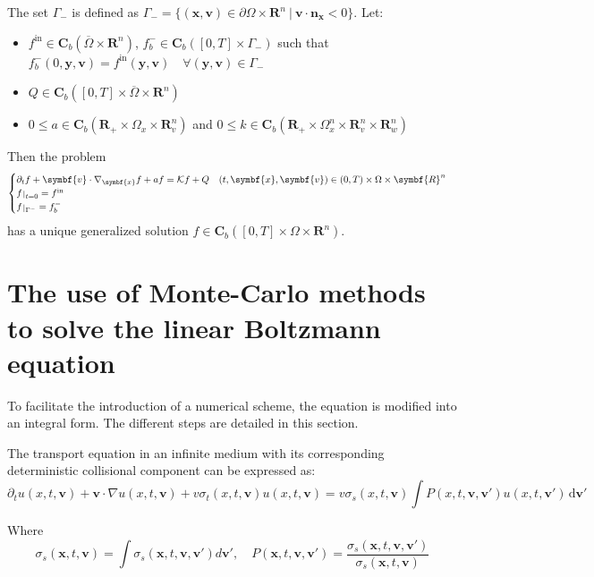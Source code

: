 \documentclass[a4paper, 11pt]{article}
\newcommand{\bm}{\symbf}
\newcommand{\di}{\ensuremath{\, \mathrm{d}}}
\def\restriction#1#2{\mathchoice
	{\setbox1\hbox{${\displaystyle #1}_{\scriptstyle #2}$}
		\restrictionaux{#1}{#2}}
	{\setbox1\hbox{${\textstyle #1}_{\scriptstyle #2}$}
		\restrictionaux{#1}{#2}}
	{\setbox1\hbox{${\scriptstyle #1}_{\scriptscriptstyle #2}$}
		\restrictionaux{#1}{#2}}
	{\setbox1\hbox{${\scriptscriptstyle #1}_{\scriptscriptstyle #2}$}
		\restrictionaux{#1}{#2}}}
\def\restrictionaux#1#2{{#1\,\smash{\vrule height .8\ht1 depth .85\dp1}}_{\,#2}}
\begin{document}
The set $\Gamma_-$ is defined as $\Gamma_-= \{(\bm{x},\bm{v}) \in \partial \Omega \times \bm{R}^n ~ | ~ \bm{v}\cdot \bm{n}_{\bm{x}}<0\}$. Let:
\begin{itemize}
	\item $f^{\mathrm{in}} \in \mathbf{C}_b(\overline{\Omega} \times \bm{R}^n)$, $f_b^- \in \mathbf{C}_b([0,T] \times \Gamma_-)$ such that $f_b^-(0,\bm{y},\bm{v})=f^{\mathrm{in}}(\bm{y},\bm{v}) \quad \forall (\bm{y},\bm{v}) \in \Gamma_-$
	\item $Q \in \mathbf{C}_b([0,T] \times \overline{\Omega} \times \bm{R}^n)$
	\item $0 \leq a \in \mathbf{C}_b(\bm{R}_+ \times \Omega_x \times \bm{R}_v^n)$ and $0 \leq k \in \mathbf{C}_b(\bm{R}_+ \times \Omega_x^n \times \bm{R}_v^n \times \bm{R}_w^n)$
\end{itemize}

Then the problem
\[
\begin{cases}
\partial_t f+\bm{v} \cdot \nabla_{\bm{x}} f +af =   \mathcal{K} f +Q \quad (t,\bm{x},\bm{v}) \in (0,T) \times \Omega \times \bm{R}^n\\
\restriction{f}{t=0}= f^{\mathrm{in}}\\
\restriction{f}{\Gamma^-}=f_b^-
\end{cases}
\]
has a unique generalized solution $f \in \mathbf{C}_b([0,T] \times \Omega \times \bm{R}^n)$.

\section{The use of Monte-Carlo methods to solve the linear Boltzmann equation}


To facilitate the introduction of a numerical scheme, the equation is modified into an integral form. The different steps are detailed in this section.

The transport equation in an infinite medium with its corresponding deterministic collisional component\cite{lapeyre_methodes_1998} can be expressed as:
\begin{equation}
\partial _t u(x,t,\bm{v}) + \bm{v} \cdot \nabla u(x,t,\bm{v}) + v\sigma_t (x,t,\bm{v})u(x,t,\bm{v})= v\sigma_s(x,t,\bm{v})\int P (x,t,\bm{v},\bm{v}')u(x,t,\bm{v}')\di\bm{v}' \label{ref11}
\end{equation}

Where 
\begin{equation*}
\sigma_s (\bm{x},t,\bm{v})= \int \sigma_s (\bm{x},t,\bm{v},\bm{v}')d\bm{v}', \quad  P (\bm{x},t,\bm{v},\bm{v}')= \frac{\sigma_s (\bm{x},t,\bm{v},\bm{v}')}{\sigma_s (\bm{x},t,\bm{v})}
\end{equation*}
\end{document}
